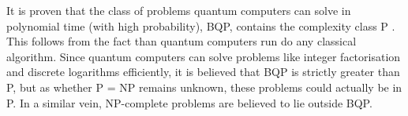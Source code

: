 It is proven that the class of problems quantum computers can solve in polynomial time (with high probability), BQP, contains the complexity class P \cite{nielsen2012}.
This follows from the fact than quantum computers run do any classical algorithm.
Since quantum computers can solve problems like integer factorisation and discrete logarithms efficiently, it is believed that BQP is strictly greater than P, but as whether P = NP remains unknown, these problems could actually be in P.
In a similar vein, NP-complete problems are believed to lie outside BQP.